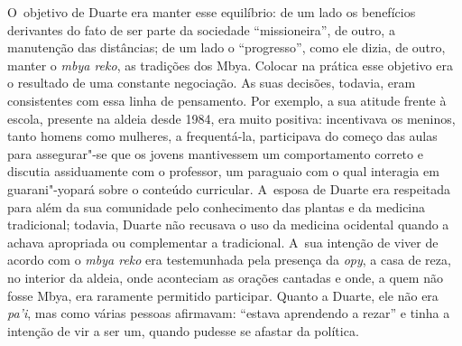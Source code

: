 O~objetivo de Duarte era manter esse equilíbrio: de um lado os
benefícios derivantes do fato de ser parte da sociedade ``missioneira'', de
outro, a manutenção das distâncias; de um lado o ``progresso'', como ele
dizia, de outro, manter o \emph{mbya reko}, as tradições dos Mbya. Colocar na
prática esse objetivo era o resultado de uma constante negociação. As
suas decisões, todavia, eram consistentes com essa linha de pensamento.
Por exemplo, a sua atitude frente à escola, presente na aldeia desde
1984, era muito positiva: incentivava os meninos, tanto homens como
mulheres, a frequentá-la, participava do começo das aulas para
assegurar"-se que os jovens mantivessem um comportamento correto e
discutia assiduamente com o professor, um paraguaio com o qual
interagia em guarani"-yopará sobre o conteúdo curricular. A~esposa de
Duarte era respeitada para além da sua comunidade pelo conhecimento das
plantas e da medicina tradicional; todavia, Duarte não recusava o uso da
medicina ocidental quando a achava apropriada ou complementar a
tradicional. A~sua intenção de viver de acordo com o \emph{mbya reko} era
testemunhada pela presença da \emph{opy}, a casa de reza, no interior da
aldeia, onde aconteciam as orações cantadas e onde, a quem não fosse
Mbya, era raramente permitido participar. Quanto a Duarte, ele não era
\emph{pa’i}, mas como várias pessoas afirmavam: ``estava aprendendo a rezar'' e
tinha a intenção de vir a ser um, quando pudesse se afastar da
política.

